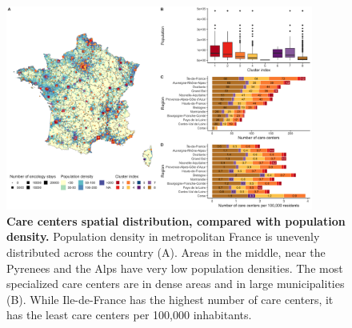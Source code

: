 \begin{figure}[H]
    \includegraphics[width=0.9\textwidth]{images/camion/supplemental/sup_fig4_care_centers_pop_density.png}
    \centering
    \caption{ \textbf{Care centers spatial distribution, compared with
            population density.} Population density in metropolitan France is
        unevenly distributed across the country (A). Areas in the middle, near
        the Pyrenees and the Alps have very low population densities. The most
        specialized care centers are in dense areas and in large municipalities
        (B). While Ile-de-France has the highest number of care centers, it has
        the least care centers per 100,000 inhabitants. }
    \label{fig:clustering-map}
\end{figure}

